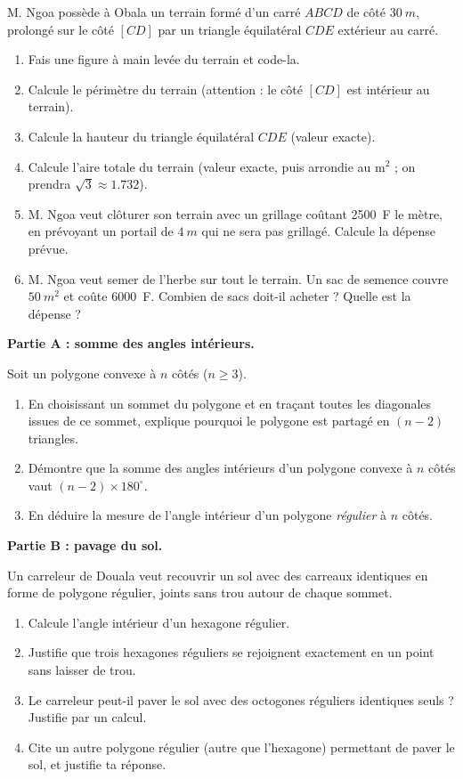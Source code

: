 \documentclass[11pt]{article}
\begin{document}
\begin{exercice}
M. Ngoa possède à Obala un terrain formé d'un carré $ABCD$ de côté $\SI{30}{m}$, prolongé sur le côté $[CD]$ par un triangle équilatéral $CDE$ extérieur au carré.
\begin{enumerate}
\item Fais une figure à main levée du terrain et code-la.
\item Calcule le périmètre du terrain (attention : le côté $[CD]$ est intérieur au terrain).
\item Calcule la hauteur du triangle équilatéral $CDE$ (valeur exacte).
\item Calcule l'aire totale du terrain (valeur exacte, puis arrondie au $\text{m}^2$ ; on prendra $\sqrt{3} \approx \num{1,732}$).
\item M. Ngoa veut clôturer son terrain avec un grillage coûtant \SI{2500}{F} le mètre, en prévoyant un portail de $\SI{4}{m}$ qui ne sera pas grillagé. Calcule la dépense prévue.
\item M. Ngoa veut semer de l'herbe sur tout le terrain. Un sac de semence couvre $\SI{50}{m^2}$ et coûte \SI{6000}{F}. Combien de sacs doit-il acheter ? Quelle est la dépense ?
\end{enumerate}
\end{exercice}

\begin{exercice}
\textbf{Partie A : somme des angles intérieurs.}

Soit un polygone convexe à $n$ côtés ($n \geq 3$).
\begin{enumerate}
\item En choisissant un sommet du polygone et en traçant toutes les diagonales issues de ce sommet, explique pourquoi le polygone est partagé en $(n-2)$ triangles.
\item Démontre que la somme des angles intérieurs d'un polygone convexe à $n$ côtés vaut $(n-2) \times 180^{\circ}$.
\item En déduire la mesure de l'angle intérieur d'un polygone \emph{régulier} à $n$ côtés.
\end{enumerate}

\textbf{Partie B : pavage du sol.}

Un carreleur de Douala veut recouvrir un sol avec des carreaux identiques en forme de polygone régulier, joints sans trou autour de chaque sommet.
\begin{enumerate}
\item Calcule l'angle intérieur d'un hexagone régulier.
\item Justifie que trois hexagones réguliers se rejoignent exactement en un point sans laisser de trou.
\item Le carreleur peut-il paver le sol avec des octogones réguliers identiques seuls ? Justifie par un calcul.
\item Cite un autre polygone régulier (autre que l'hexagone) permettant de paver le sol, et justifie ta réponse.
\end{enumerate}
\end{exercice}
\end{document}
